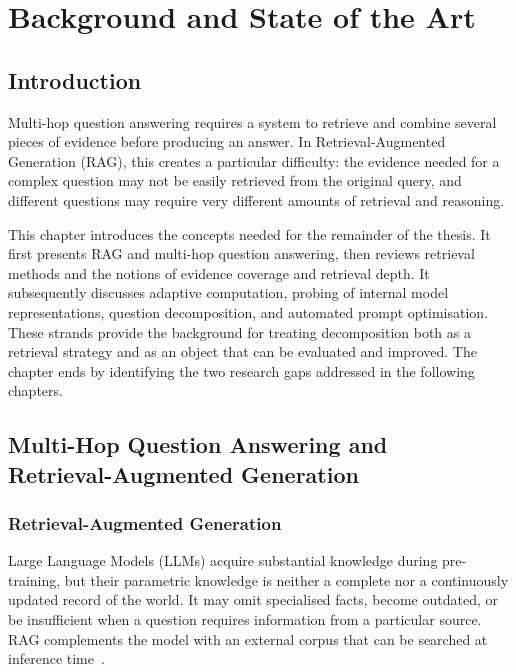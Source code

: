 \chapter{Background and State of the Art}
\label{chap:background}

\section*{Introduction}
{}

Multi-hop question answering requires a system to retrieve and combine several
pieces of evidence before producing an answer. In Retrieval-Augmented Generation
(RAG), this creates a particular difficulty: the evidence needed for a complex
question may not be easily retrieved from the original query, and different
questions may require very different amounts of retrieval and reasoning.

This chapter introduces the concepts needed for the remainder of the thesis. It
first presents RAG and multi-hop question answering, then reviews retrieval
methods and the notions of evidence coverage and retrieval depth. It subsequently discusses adaptive computation, probing of internal model
representations, question decomposition, and automated prompt optimisation.
These strands provide the background for treating decomposition both as a
retrieval strategy and as an object that can be evaluated and improved. The
chapter ends by identifying the two research gaps addressed in the following
chapters.

\section[Multi-Hop Question Answering and Retrieval-Augmented Generation]
{Multi-Hop Question Answering and\\Retrieval-Augmented Generation}
\label{sec:rag-multihop}

\subsection{Retrieval-Augmented Generation}
\label{subsec:rag}

Large Language Models (LLMs) acquire substantial knowledge during pre-training,
but their parametric knowledge is neither a complete nor a continuously updated
record of the world. It may omit specialised facts, become outdated, or be
insufficient when a question requires information from a particular source.
RAG complements the model with an external corpus that can be searched at
inference time~\cite{lewis2020rag}.

